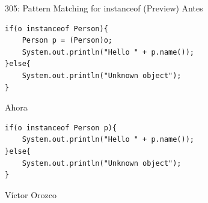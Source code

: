 \documentclass[aspectratio=169]{beamer}
\begin{document}
\begin{frame}[fragile]{305:	Pattern Matching for instanceof (Preview)}
Antes
\begin{lstlisting}
if(o instanceof Person){
    Person p = (Person)o;
    System.out.println("Hello " + p.name());
}else{
    System.out.println("Unknown object");
}
\end{lstlisting}	

Ahora
\begin{lstlisting}
if(o instanceof Person p){
    System.out.println("Hello " + p.name());
}else{
    System.out.println("Unknown object");
}
\end{lstlisting}	
\end{frame}


\begin{frame}{Víctor Orozco}
\begin{columns}[T] %
	

\end{columns}
\end{frame}
\end{document}
